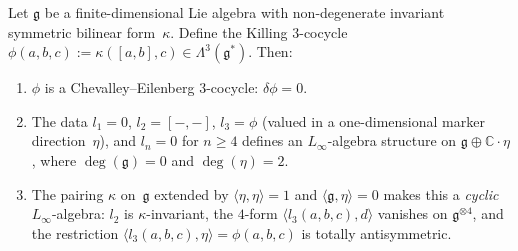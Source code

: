 \begin{proposition}\label{prop:killing-linf-extension}
Let $\mathfrak{g}$ be a finite-dimensional Lie algebra with
non-degenerate invariant symmetric bilinear form~$\kappa$.
Define the Killing $3$-cocycle
$\phi(a,b,c) := \kappa([a,b],c) \in \Lambda^3(\mathfrak{g}^*)$.
Then:
\begin{enumerate}[label=\textup{(\roman*)}]
\item $\phi$ is a Chevalley--Eilenberg $3$-cocycle:
  $\delta\phi = 0$.
\item The data $l_1 = 0$, $l_2 = [-,-]$,
  $l_3 = \phi$ \textup{(}valued in a one-dimensional marker
  direction~$\eta$\textup{)},
  and $l_n = 0$ for $n \geq 4$ defines an $L_\infty$-algebra
  structure on $\mathfrak{g} \oplus \mathbb{C}\cdot\eta$,
  where $\deg(\mathfrak{g}) = 0$ and $\deg(\eta) = 2$.
\item The pairing $\kappa$ on~$\mathfrak{g}$ extended by
  $\langle\eta,\eta\rangle = 1$ and
  $\langle\mathfrak{g},\eta\rangle = 0$ makes this a
  \emph{cyclic} $L_\infty$-algebra: $l_2$ is
  $\kappa$-invariant, the $4$-form
  $\langle l_3(a,b,c), d\rangle$ vanishes on
  $\mathfrak{g}^{\otimes 4}$, and the restriction
  $\langle l_3(a,b,c),\eta\rangle = \phi(a,b,c)$ is
  totally antisymmetric.
\end{enumerate}
\end{proposition}

